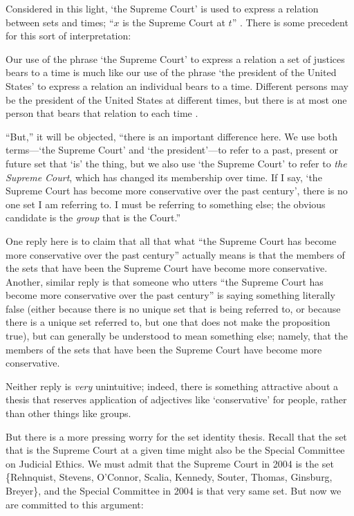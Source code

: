 \documentclass[11pt]{article}
\newenvironment{squote}{%
\begin{spacing}{1}
\begin{list}{}{%
\setlength{\labelwidth}{0pt}%
\rightmargin\leftmargin%
}
\item\relax
}{%
\end{list}%
\end{spacing}
}
\begin{document}
\begin{spacing}{1.5}
Considered in this light, `the Supreme Court' is used to express a
relation between sets and times; ``$x$ is the Supreme Court at $t$''
\citep[140]{uzquiano2004a}.  There is some precedent for this sort of
interpretation:

\begin{squote}
Our use of the phrase `the Supreme Court' to express a relation a set
of justices bears to a time is much like our use of the phrase `the
president of the United States' to express a relation an individual
bears to a time.  Different persons may be the president of the United
States at different times, but there is at most one person that bears
that relation to each time \citep[138]{uzquiano2004a}.
\end{squote}

``But,'' it will be objected, ``there is an important difference here.
We use both terms---`the Supreme Court' and `the president'---to refer
to a past, present or future set that `is' the thing, but we also use
`the Supreme Court' to refer to {\em the Supreme Court}, which has
changed its membership over time.  If I say, `the Supreme Court has
become more conservative over the past century', there is no one set I
am referring to.  I must be referring to something else; the obvious
candidate is the {\em group} that is the Court.''

One reply here is to claim that all that what ``the Supreme Court has
become more conservative over the past century'' actually means is
that the members of the sets that have been the Supreme Court have
become more conservative.  Another, similar reply is that someone who
utters ``the Supreme Court has become more conservative over the past
century'' is saying something literally false (either because there is
no unique set that is being referred to, or because there is a unique
set referred to, but one that does not make the proposition true), but
can generally be understood to mean something else; namely, that the
members of the sets that have been the Supreme Court have become more
conservative.

Neither reply is {\em very} unintuitive; indeed, there is something
attractive about a thesis that reserves application of adjectives like
`conservative' for people, rather than other things like groups.

But there is a more pressing worry for the set identity thesis.
Recall that the set that is the Supreme Court at a given time might
also be the Special Committee on Judicial Ethics.  We must admit that
the Supreme Court in 2004 is the set \{Rehnquist, Stevens, O'Connor,
Scalia, Kennedy, Souter, Thomas, Ginsburg, Breyer\}, and the Special
Committee in 2004 is that very same set.  But now we are committed to
this argument:


\end{spacing}
\end{document}
